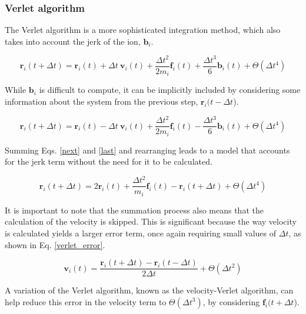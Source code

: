 \documentclass[12pt]{report}
\begin{document}
\subsubsection{Verlet algorithm}

The Verlet algorithm is a more sophisticated integration method, which also takes into account the jerk of the ion, $\textbf{b}_i$.

\begin{equation}
    \textbf{r}_i(t+\Delta t) = \textbf{r}_i(t) + \Delta t \ \textbf{v}_i(t) + \frac{\Delta t^2}{2m_i} \textbf{f}_i(t) + \frac{\Delta t^3}{6} \textbf{b}_i(t) + \Theta (\Delta t^4)
    \label{next}
\end{equation}

\noindent
While $\textbf{b}_i$ is difficult to compute, it can be implicitly included by considering some information about the system from the previous step, $\textbf{r}_i(t-\Delta t$).

\begin{equation}
    \textbf{r}_i(t+\Delta t) = \textbf{r}_i(t) - \Delta t \ \textbf{v}_i(t) + \frac{\Delta t^2}{2m_i} \textbf{f}_i(t) - \frac{\Delta t^3}{6} \textbf{b}_i(t) + \Theta (\Delta t^4)
    \label{last}
\end{equation}

\noindent
Summing Eqs. \ref{next} and \ref{last} and rearranging leads to a model that accounts for the jerk term without the need for it to be calculated.

\begin{equation}
    \textbf{r}_i(t+\Delta t) = 2\textbf{r}_i(t) + \frac{\Delta t^2}{m_i}\textbf{f}_i(t) - \textbf{r}_i(t+\Delta t) + \Theta (\Delta t^4)
\end{equation}

\noindent
It is important to note that the summation process also means that the calculation of the velocity is skipped.
This is significant because the way velocity is calculated yields a larger error term, once again requiring small values of $\Delta t$, as shown in Eq. \ref{verlet_error}. 

\begin{equation}
    \textbf{v}_i(t) = \frac{\textbf{r}_i(t+ \Delta t) - \textbf{r}_i(t-\Delta t)}{2 \Delta t} + \Theta(\Delta t^2)
    \label{verlet_error}
\end{equation}

\noindent
A variation of the Verlet algorithm, known as the velocity-Verlet algorithm, can help reduce this error in the velocity term to $\Theta(\Delta t^3)$, by considering $\textbf{f}_i(t+\Delta t$).
\end{document}
